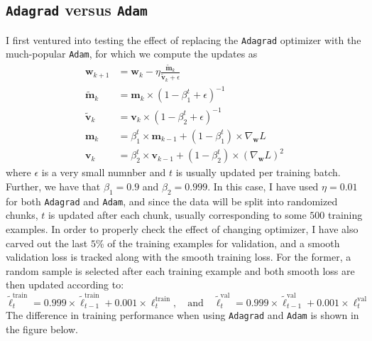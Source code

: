 \documentclass{article}
\begin{document}
\newpage
\subsection*{\texttt{Adagrad} versus \texttt{Adam}}
	I first ventured into testing the effect of replacing the \texttt{Adagrad} optimizer with the much-popular \texttt{Adam}, for which we compute the updates as
	\begin{align*}
		\bm{w}_{k+1} &= \bm{w}_k - \eta\frac{\tilde{\bm{m}}_k}{\tilde{\bm{v}}_k + \epsilon} \\
		\tilde{\bm{m}}_k &= \bm{m}_k \times (1 - \beta_1^t + \epsilon)^{-1} \\
		\tilde{\bm{v}}_k &= \bm{v}_k \times (1 - \beta_2^t + \epsilon)^{-1} \\
		\bm{m}_k &= \beta_1^t \times \bm{m}_{k-1} + (1 - \beta_1^t)\times\nabla_{\bm{w}}L \\
		\bm{v}_k &= \beta_2^t \times \bm{v}_{k-1} + (1 - \beta_2^t) \times (\nabla_{\bm{w}}L)^2
	\end{align*}
	where $\epsilon$ is a very small numnber and $t$ is usually updated per training batch. Further, we have that $\beta_1 = 0.9$ and $\beta_2 = 0.999$. In this case, I have used $\eta = 0.01$ for both \texttt{Adagrad} and \texttt{Adam}, and since the data will be split into randomized chunks, $t$ is updated after each chunk, usually corresponding to some $500$ training examples. In order to properly check the effect of changing optimizer, I have also carved out the last $5$\% of the training examples for validation, and a smooth validation loss is tracked along with the smooth training loss. For the former, a random sample is selected after each training example and both smooth loss are then updated according to:
	    $$\tilde{\ell}^{\text{train}}_t = 0.999\times\tilde{\ell}^{\text{train}}_{t-1} + 0.001 \times\ell^{\text{train}}_{t}, \quad\text{and}\quad \tilde{\ell}^{\text{val}}_t = 0.999\times\tilde{\ell}^{\text{val}}_{t-1} + 0.001 \times\ell^{\text{val}}_{t}$$
	The difference in training performance when using \texttt{Adagrad} and \texttt{Adam} is shown in the figure below.
\end{document}
